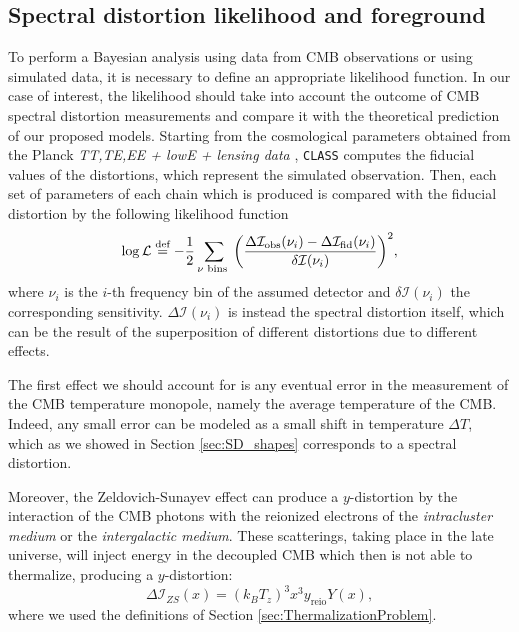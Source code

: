 \subsection{Spectral distortion likelihood and foreground}
To perform a Bayesian analysis using data from CMB observations or using simulated data, it is necessary to define an appropriate likelihood function. In our case of interest, the likelihood should take into account the outcome of CMB spectral distortion measurements and compare it with the theoretical prediction of our proposed models. Starting from the cosmological parameters obtained from the Planck \emph{TT,TE,EE + lowE + lensing data} \cite{planck2018results}, \texttt{CLASS} computes the fiducial values of the distortions, which represent the simulated observation. Then, each set of parameters of each chain which is produced is compared with the fiducial distortion by the following likelihood function
\begin{equation}
    \log \mathcal L\stackrel{\text{def}}{=} -\frac12 \sum_{\nu \text{ bins }}\bigg(\frac{\Delta\mathcal I_\text{obs}(\nu_i)-\Delta\mathcal I_\text{fid}(\nu_i)}{\delta \mathcal I(\nu_i)}\bigg)^2,
\end{equation}
where $\nu_i$ is the $i$-th frequency bin of the assumed detector and $\delta \mathcal I(\nu_i)$ the corresponding sensitivity. $\Delta \mathcal I(\nu_i)$ is instead the spectral distortion itself, which can be the result of the superposition of different distortions due to different effects. 

The first effect we should account for is any eventual error in the measurement of the CMB temperature monopole, namely the average temperature of the CMB. Indeed, any small error can be modeled as a small shift in temperature $\Delta T$, which as we showed in Section \ref{sec:SD_shapes} corresponds to a spectral distortion.

Moreover, the Zeldovich-Sunayev effect \cite{Zeldovich1972} can produce a $y$-distortion by the interaction of the CMB photons with the reionized electrons of the \emph{intracluster medium} or the \emph{intergalactic medium}. These scatterings, taking place in the late universe, will inject energy in the decoupled CMB which then is not able to thermalize, producing a $y$-distortion:
$$ \Delta \mathcal I_{ZS}(x)=(k_BT_z)^3x^3 y_\text{reio} Y(x),$$
where we used the definitions of Section \ref{sec:ThermalizationProblem}.

